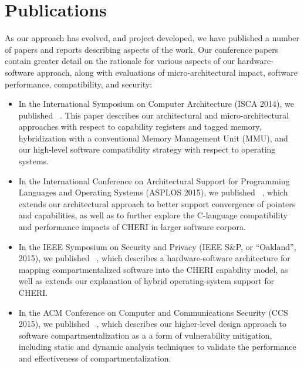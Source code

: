 \section{Publications}
\label{sec:publications}

As our approach has evolved, and project developed, we have published a number
of papers and reports describing aspects of the work.
Our conference papers contain greater detail on the rationale for various
aspects of our hardware-software approach, along with evaluations of
micro-architectural impact, software performance, compatibility, and security:

\begin{itemize}
\item In the International Symposium on Computer Architecture (ISCA 2014), we
  published ~\cite{woodruff:cheriisca2014}.
  This paper describes our architectural and micro-architectural approaches
  with respect to capability registers and tagged memory, hybridization with a
  conventional Memory Management Unit (MMU), and our high-level software
  compatibility strategy with respect to operating systems.

\item In the International Conference on Architectural Support for Programming
  Languages and Operating Systems (ASPLOS 2015), we published
  ~\cite{ChisnallCPDP11}, which extends our architectural approach to
  better support convergence of pointers and capabilities, as well as to
  further explore the C-language compatibility and performance impacts of
  CHERI in larger software corpora.

\item In the IEEE Symposium on Security and Privacy (IEEE S\&P, or
  ``Oakland'', 2015), we
  published ~\cite{watson15:cheri}, which
  describes a hardware-software architecture for mapping compartmentalized
  software into the CHERI capability model, as well as extends our explanation
  of hybrid operating-system support for CHERI.

\item In the ACM Conference on Computer and Communications Security (CCS
  2015), we published ~\cite{gudka15:soaap},
  which describes our higher-level design
  approach to software compartmentalization as a a form of vulnerability
  mitigation, including static and dynamic analysis techniques to validate the
  performance and effectiveness of compartmentalization.


\end{itemize}
